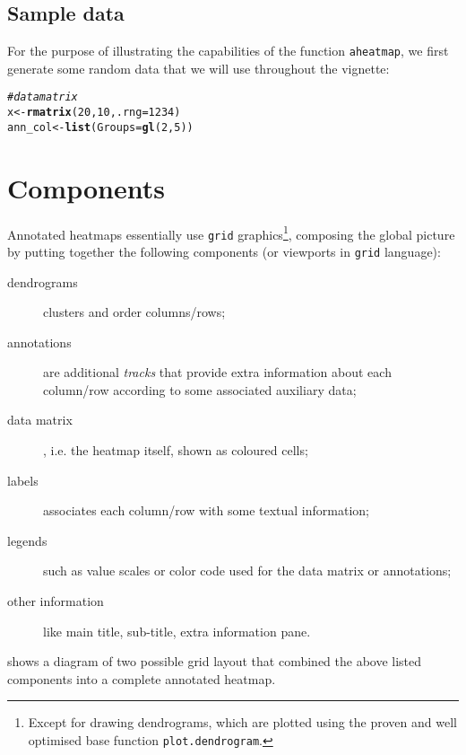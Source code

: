 \documentclass[a4paper]{article}\usepackage[]{graphicx}\usepackage[]{color}
\makeatletter
\newcommand{\hlnum}[1]{\textcolor[rgb]{0.686,0.059,0.569}{#1}}%
\newcommand{\hlcom}[1]{\textcolor[rgb]{0.678,0.584,0.686}{\textit{#1}}}%
\newcommand{\hlstd}[1]{\textcolor[rgb]{0.345,0.345,0.345}{#1}}%
\newcommand{\hlkwb}[1]{\textcolor[rgb]{0.69,0.353,0.396}{#1}}%
\newcommand{\hlkwc}[1]{\textcolor[rgb]{0.333,0.667,0.333}{#1}}%
\newcommand{\hlkwd}[1]{\textcolor[rgb]{0.737,0.353,0.396}{\textbf{#1}}}%
\newenvironment{kframe}{%
 \def\at@end@of@kframe{}%
 \ifinner\ifhmode%
  \def\at@end@of@kframe{\end{minipage}}%
  \begin{minipage}{\columnwidth}%
 \fi\fi%
 \def\FrameCommand##1{\hskip\@totalleftmargin \hskip-\fboxsep
 \colorbox{shadecolor}{##1}\hskip-\fboxsep
     \hskip-\linewidth \hskip-\@totalleftmargin \hskip\columnwidth}%
 \MakeFramed {\advance\hsize-\width
   \@totalleftmargin\z@ \linewidth\hsize
   \@setminipage}}%
 {\par\unskip\endMakeFramed%
 \at@end@of@kframe}
\newenvironment{knitrout}{}{} %
\let\code=\texttt
\makeatother
\begin{document}
\subsection{Sample data}
For the purpose of illustrating the capabilities of the function
\code{aheatmap}, we first generate some random data that we will use throughout
the vignette:

\begin{knitrout}\small
{}\color{fgcolor}\begin{kframe}
\begin{alltt}
\hlcom{# data matrix}
\hlstd{x} \hlkwb{<-} \hlkwd{rmatrix}\hlstd{(}\hlnum{20}\hlstd{,} \hlnum{10}\hlstd{,} \hlkwc{.rng} \hlstd{=} \hlnum{1234}\hlstd{)}
\hlstd{ann_col} \hlkwb{<-} \hlkwd{list}\hlstd{(}\hlkwc{Groups} \hlstd{=} \hlkwd{gl}\hlstd{(}\hlnum{2}\hlstd{,} \hlnum{5}\hlstd{))}
\end{alltt}
\end{kframe}
\end{knitrout}

\section{Components}

Annotated heatmaps essentially use \code{grid} graphics\footnote{Except for
drawing dendrograms, which are plotted using the proven and well optimised base
function \code{plot.dendrogram}.}, composing the global picture by putting
together the following components (or viewports in \code{grid} language):

\begin{description}
  \item[dendrograms] clusters and order columns/rows; 
  \item[annotations] are additional \emph{tracks} that provide extra
  information about each column/row according to some associated auxiliary data;
  \item[data matrix], i.e. the heatmap itself, shown as coloured cells;
  \item[labels] associates each column/row with some textual information;
  \item[legends] such as value scales or color code used for the data matrix or
  annotations;
  \item[other information] like main title, sub-title, extra information pane.
\end{description}

 shows a diagram of two possible grid layout that combined
the above listed components into a complete annotated heatmap.
\end{document}
